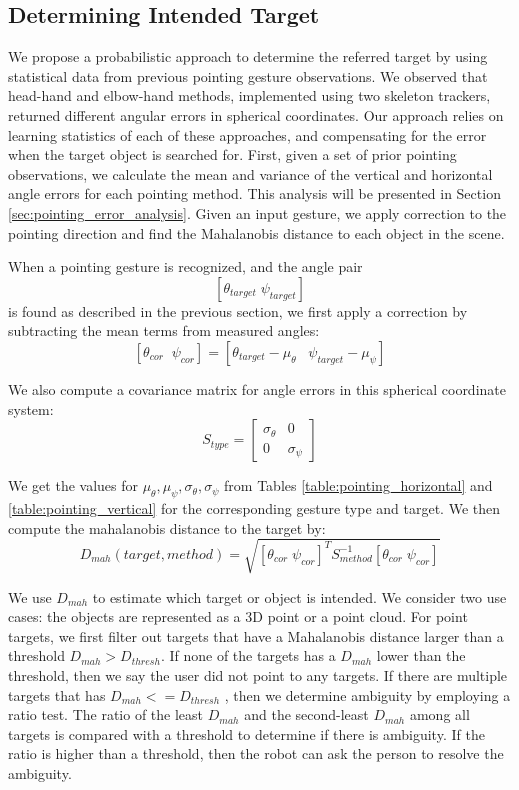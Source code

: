 \subsection{Determining Intended Target}
\label{sec:pointing_determining_intended_target}

We propose a probabilistic approach to determine the referred target by using statistical data from previous pointing gesture observations. We observed that head-hand and elbow-hand methods, implemented using two skeleton trackers, returned different angular errors in spherical coordinates. Our approach relies on learning statistics of each of these approaches, and compensating for the error when the target object is searched for. First, given a set of prior pointing observations, we calculate the mean and variance of the vertical and horizontal angle errors for each pointing method. This analysis will be presented in Section \ref{sec:pointing_error_analysis}. Given an input gesture, we apply correction to the pointing direction and find the Mahalanobis distance to each object in the scene.

When a pointing gesture is recognized, and the angle pair $$[\theta_{target}\;\psi_{target}]$$ is found as described in the previous section, we first apply a correction by subtracting the mean terms from measured angles:
$$[\theta_{cor}\;\;\psi_{cor}]=[\theta_{target}-\mu_{\theta}\;\;\;\psi_{target}-\mu_{\psi}]$$
 
We also compute a covariance matrix for angle errors in this spherical coordinate system: 
$$S_{type} = \begin{bmatrix}
\sigma_{\theta}&0\\ 0&\sigma_{\psi}
\end{bmatrix} $$

We get the values for $\mu_{\theta}, \mu_{\psi}, \sigma_{\theta} ,\sigma_{\psi}$ from Tables \ref{table:pointing_horizontal} and \ref{table:pointing_vertical} for the corresponding gesture type and target. We then compute the mahalanobis distance to the target by:
$$D_{mah}(target,method)=\sqrt{ [\theta_{cor}\;\psi_{cor}]^T S_{method}^{-1} [\theta_{cor}\;\psi_{cor}]}$$
 
We use $D_{mah}$ to estimate which target or object is intended. We consider two use cases: the objects are represented as a 3D point or a point cloud. For point targets, we first filter out targets that have a Mahalanobis distance larger than a threshold $D_{mah} > D_{thresh}$. If none of the targets has a $D_{mah}$ lower than the threshold, then we say the user did not point to any targets. If there are multiple targets that has $D_{mah} <= D_{thresh}$ , then we determine ambiguity by employing a ratio test. The ratio of the least $D_{mah}$ and the second-least $D_{mah}$ among all targets is compared with a threshold to determine if there is ambiguity. If the ratio is higher than a threshold, then the robot can ask the person to resolve the ambiguity.

